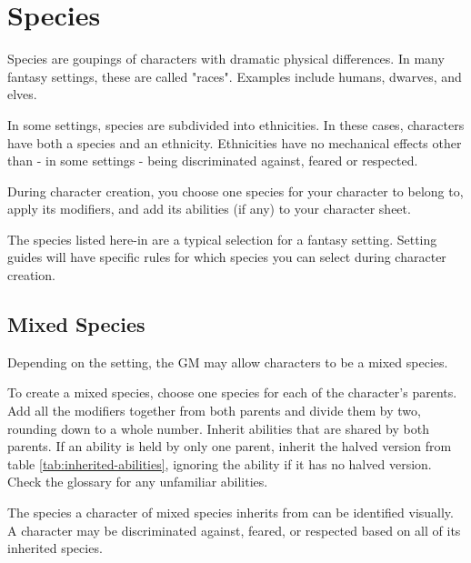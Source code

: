 \chapter{Species}\label{species}

\begin{multicols*}{2}
    Species are goupings of characters with dramatic physical differences. In many
    fantasy settings, these are called "races". Examples include humans, dwarves,
    and elves.

    In some settings, species are subdivided into ethnicities. In these cases,
    characters have both a species and an ethnicity. Ethnicities have no mechanical
    effects other than - in some settings - being discriminated against, feared or
    respected.

    During character creation, you choose one species for your character to belong
    to, apply its modifiers, and add its abilities (if any) to your character
    sheet.

    The species listed here-in are a typical selection for a fantasy setting.
    Setting guides will have specific rules for which species you can select
    during character creation.

    \section{Mixed Species}

    Depending on the setting, the GM may allow characters to be a mixed species.

    To create a mixed species, choose one species for each of the character's
    parents. Add all the modifiers together from both parents and divide them
    by two, rounding down to a whole number. Inherit abilities that are shared by
    both parents. If an ability is held by only one parent, inherit the halved
    version from table \ref{tab:inherited-abilities}, ignoring the ability if
    it has no halved version. Check the glossary for
    any unfamiliar abilities.

    The species a character of mixed species inherits from can be identified
    visually. A character may be discriminated against, feared, or respected
    based on all of its inherited species.


\end{multicols*}
